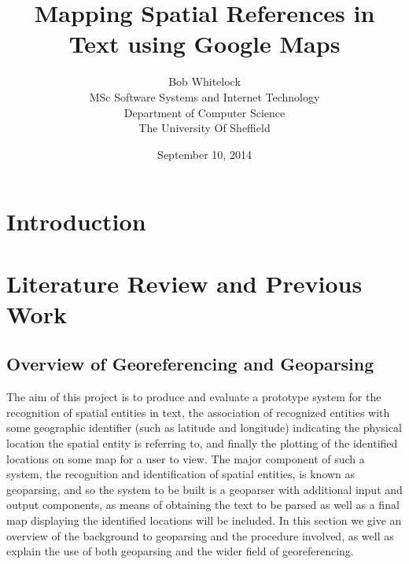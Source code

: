 \documentclass[12pt, a4paper]{report}
\title{Mapping Spatial References in Text using Google Maps}
\date{September 10, 2014}
\author{Bob Whitelock\\ MSc Software Systems and Internet Technology\\ Department of Computer Science\\ The University Of Sheffield}
\begin{document}
\maketitle

\begin{abstract}

\end{abstract}

\tableofcontents

\glsaddall
\printglossaries

\chapter{Introduction}




\chapter{Literature Review and Previous Work}


\section{Overview of Georeferencing and Geoparsing}


The aim of this project is to produce and evaluate a prototype system for the recognition of spatial entities in text, the association of recognized entities with some geographic identifier (such as latitude and longitude) indicating the physical location the spatial entity is referring to, and finally the plotting of the identified locations on some map for a user to view. The major component of such a system, the recognition and identification of spatial entities, is known as geoparsing, and so the system to be built is a geoparser with additional input and output components, as means of obtaining the text to be parsed as well as a final map displaying the identified locations will be included. In this section we give an overview of the background to geoparsing and the procedure involved, as well as explain the use of both geoparsing and the wider field of georeferencing.
\end{document}

